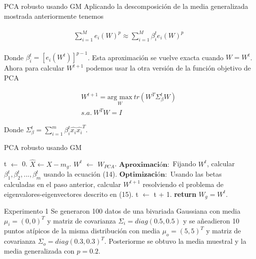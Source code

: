 \documentclass{beamer}
\begin{document}
\begin{frame}{PCA robusto usando GM}
	Aplicando la descomposición de la media generalizada mostrada anteriormente tenemos
	
	\begin{align}
	\label{eqn:eqlabel}
	\begin{split}
		\sum_{i = 1}^M e_i(W)^p \approx \sum_{i = 1}^M \beta_i^t e_i(W)^p
	\end{split}
	\end{align}
	
	Donde $\beta_i^t = [e_i(W^t)]^{p - 1}$. Esta aproximación se vuelve exacta cuando $W = W^t$. Ahora para calcular $W^{t + 1}$ podemos usar la otra versión de la función objetivo de PCA
	
	\begin{align}
	\label{eqn:eqlabel}
	\begin{split}
		W^{t + 1} = \underset{W}{\text{arg max}}\ tr(W^T \Sigma_\beta^t W)\\
	s.a.\ W^T W = I
	\end{split}
	\end{align}
	
	Donde $\Sigma_\beta^t = \sum_{i = 1}^m \beta_i^t \hat{x_i} \hat{x_i}^T$.
\end{frame}

\begin{frame}{PCA robusto usando GM}
	\begin{algorithm}[H]
		\caption{PCA robusto con media generalizada}
		\begin{algorithmic}[1]
			\State t $\gets$ 0.
			\State $\hat{X} \gets X - m_g$.
			\State $W^t$ $\gets$ $W_{PCA}$.
			\State $\textbf{Aproximación}:$ Fijando $W^t$, calcular $\beta_1^t, \beta_2^t, ..., \beta_m^t$ usando la ecuación (14).
			\State $\textbf{Optimización}:$ Usando las betas calculadas en el paso anterior, calcular $W^{t + 1}$ resolviendo el problema de eigenvalores-eigenvectores descrito en (15).
			\State t $\gets$ t + 1.
			\EndWhile
			\State \textbf{return} $W_g = W^t$.
			\EndProcedure
		\end{algorithmic}
	\end{algorithm}
\end{frame}

\begin{frame}{Experimento 1}
	Se generaron 100 datos de una bivariada Gaussiana con media $\mu_i = (0, 0)^T$ y matriz de covarianza $\Sigma_i = diag(0.5, 0.5)$ y se añeadieron 10 puntos atípicos de la misma distribución con media $\mu_o = (5, 5)^T$ y matriz de covarianza $\Sigma_o = diag(0.3, 0.3)^T$. Posteriorme se obtuvo la media muestral y la media generalizada con $p = 0.2$.
\end{frame}
\end{document}
